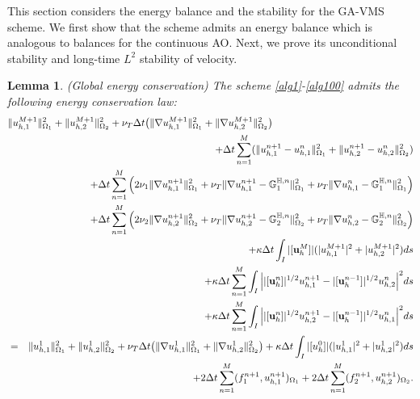 \documentclass[10pt]{article}%
\numberwithin{equation}{section}
\newtheorem{lemma}{Lemma}[section]
\newcommand{\bff}{{  f}}
\newcommand{\bu}{{\bf u}}
\begin{document}
This section considers the energy balance and the stability for the GA-VMS scheme. We first show that the scheme admits an energy balance which is analogous to balances for the continuous AO. Next, we prove its unconditional stability and long-time $L^2$ stability of velocity.
\begin{lemma}(Global energy conservation) The scheme \eqref{alg1}-\eqref{alg100} admits the following energy conservation law:
	\begin{eqnarray}
	\lefteqn{\|{u^{M+1}_{h,1}}\|_{\Omega_1}^2 +\|{u^{M+1}_{h,2}}\|_{\Omega_2}^2 + \nu_T\Delta t\big(\|\nabla  u_{h,1}^{M+1}\|^2_{\Omega_1}+\|\nabla  u_{h,2}^{M+1}\|^2_{\Omega_2}\big)} \nonumber \\
	&&+\Delta t \sum_{n=1}^M(\|{{u^{n+1}_{h,1}}-u_{h,1}^{n}}\|_{\Omega_1}^2+\|{{u^{n+1}_{h,2}}-u_{h,2}^{n}}\|_{\Omega_2}^2)\nonumber\\
	&&+\Delta t \sum_{n=1}^M \Big(2\nu_1\|\nabla  u_{h,1}^{n+1}\|^2_{\Omega_1} + \nu_T\|\nabla  u_{h,1}^{n+1} - \mathbb{G}_1^{\mathbb{H},n}\|^2_{\Omega_1}+\nu_T \|\nabla  u_{h,1}^{n} - \mathbb{G}_1^{\mathbb{H},n}\|^2_{\Omega_1} \Big)\nonumber\\
	&&+\Delta t \sum_{n=1}^M \Big(2\nu_2\|\nabla  u_{h,2}^{n+1}\|^2_{\Omega_2} + \nu_T\|\nabla  u_{h,2}^{n+1} - \mathbb{G}_2^{\mathbb{H},n}\|^2_{\Omega_2}+\nu_T \|\nabla  u_{h,2}^{n} - \mathbb{G}_2^{\mathbb{H},n}\|^2_{\Omega_2} \Big)\nonumber\\
	&&+\kappa \Delta t \int_{I}|[\bu_h^M]| (|u_{h,1}^{M+1}|^2+|u_{h,2}^{M+1}|^2)ds\nonumber\\
	&&+\kappa \Delta t \sum_{n=1}^M \int_{I}\Big{|}|[\bu_h^n]|^{1/2}u_{h,1}^{n+1}-|[\bu_h^{n-1}]|^{1/2}u_{h,2}^{n}\Big{|}^2ds\nonumber\\
	&&+\kappa \Delta t \sum_{n=1}^M \int_{I}\Big{|}|[\bu_h^n]|^{1/2}u_{h,2}^{n+1}-|[\bu_h^{n-1}]|^{1/2}u_{h,1}^{n}\Big{|}^2ds \nonumber\allowdisplaybreaks\\
	&=&\|{u^{1}_{h,1}}\|_{\Omega_1}^2+\|{u^{1}_{h,2}}\|_{\Omega_2}^2
	+ \nu_T\Delta t\big(\|\nabla  u_{h,1}^{1}\|^2_{\Omega_1}+\|\nabla  u_{h,2}^{1}\|^2_{\Omega_2}\big)
	+\kappa \Delta t \int_{I}|[u_h^{0}]| (|u_{h,1}^{1}|^2+|u_{h,2}^{1}|^2)ds\nonumber\allowdisplaybreaks\\&&+2\Delta t \sum_{n=1}^M(\bff_1^{n+1},u_{h,1}^{n+1})_{\Omega_1}+2\Delta t \sum_{n=1}^M(\bff_2^{n+1},u_{h,2}^{n+1})_{\Omega_2}.\label{enrgy}
	\end{eqnarray}
\end{lemma}
\end{document}
